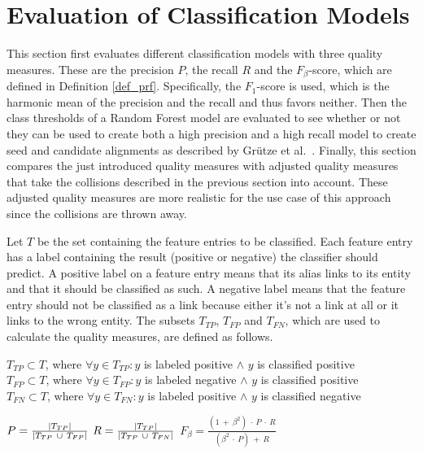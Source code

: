 \section{Evaluation of Classification Models}
\label{sec:ModelEval}
This section first evaluates different classification models with three quality measures. These are the precision $P$, the recall $R$ and the $F_{\beta}$-score, which are defined in Definition \ref{def_prf}. Specifically, the $F_1$-score is used, which is the harmonic mean of the precision and the recall and thus favors neither. Then the class thresholds of a Random Forest model are evaluated to see whether or not they can be used to create both a high precision and a high recall model to create seed and candidate alignments as described by Grütze et al.\ \cite{coheel}. Finally, this section compares the just introduced quality measures with adjusted quality measures that take the collisions described in the previous section into account. These adjusted quality measures are more realistic for the use case of this approach since the collisions are thrown away.\par
Let $T$ be the set containing the feature entries to be classified. Each feature entry has a label containing the result (positive or negative) the classifier should predict. A positive label on a feature entry means that its alias links to its entity and that it should be classified as such. A negative label means that the feature entry should not be classified as a link because either it's not a link at all or it links to the wrong entity. The subsets $T_{TP}$, $T_{FP}$ and $T_{FN}$, which are used to calculate the quality measures, are defined as follows.\\
\begin{nscenter}
	$T_{TP} \subset T$, where $\forall y \in T_{TP}: y$ is labeled positive $\land$ $y$ is classified positive\\
	$T_{FP} \subset T$, where $\forall y \in T_{FP}: y$ is labeled negative $\land$ $y$ is classified positive\\
	$T_{FN} \subset T$, where $\forall y \in T_{FN}: y$ is labeled positive $\land$ $y$ is classified negative\\
\end{nscenter}
\begin{definition}
$P = \frac{\left|T_{TP}\right|}{\left|T_{TP} \ \cup \ T_{FP}\right|}$
$R = \frac{\left|T_{TP}\right|}{\left|T_{TP} \ \cup \ T_{FN}\right|}$
$F_{\beta} = \frac{(1 \ + \ \beta^2) \ \cdot \ P \ \cdot \ R}{(\beta^2 \ \cdot \ P) \ + \ R}$
\label{def_prf}
\end{definition}
